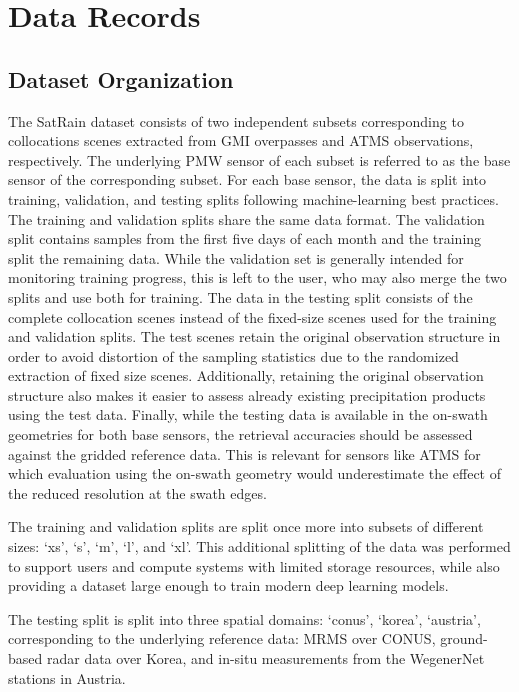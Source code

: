 \documentclass[11pt]{article}
\begin{document}
\section{Data Records}

\subsection{Dataset Organization}

The SatRain dataset consists of two independent subsets corresponding to collocations scenes extracted from GMI overpasses and ATMS observations, respectively. The underlying PMW sensor of each subset is referred to as the base sensor of the corresponding subset. For each base sensor, the data is split into training, validation, and testing splits following machine-learning best practices. The training and validation splits share the same data format. The validation split contains samples from the first five days of each month and the training split the remaining data. While the validation set is generally intended for monitoring training progress, this is left to the user, who may also merge the two splits and use both for training.
The data in the testing split consists of the complete collocation scenes instead of the fixed-size scenes used for the training and validation splits. The test scenes retain the original observation structure in order to avoid distortion of the sampling statistics due to the randomized extraction of fixed size scenes. Additionally, retaining the original observation structure also makes it easier to assess already existing precipitation products using the test data. Finally, while the testing data is available in the on-swath geometries for both base sensors, the retrieval accuracies should be assessed against the gridded reference data. This is relevant for sensors like ATMS for which evaluation using the on-swath geometry would underestimate the effect of the reduced resolution at the swath edges.

The training and validation splits are split once more into subsets of different sizes: ‘xs’, ‘s’, ‘m’, ‘l’, and ‘xl’. This additional splitting of the data was performed to support users and compute systems with limited storage resources, while also providing a dataset large enough to train modern deep learning models.

The testing split is split into three spatial domains: ‘conus’, ‘korea’, ‘austria’, corresponding to the underlying reference data: MRMS over CONUS, ground-based radar data over Korea, and in-situ measurements from the WegenerNet stations in Austria.
\end{document}
